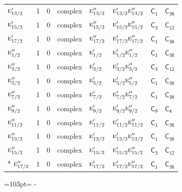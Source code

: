 \documentclass[10pt,a4paper]{article}
\newcommand{\needspace}[1]{\par\penalty-100\begingroup\dimen0=#1\relax\dimen2=\pagegoal
  \advance\dimen2-\pagetotal\ifdim\dimen0>\dimen2\relax\ifdim\dimen2>0pt\vfil\break\fi\fi
  \endgroup}
\numberwithin{equation}{section}
\newcommand{\grp}[1]{\mathsf{#1}}
\newcommand{\irr}[1]{\text{\normalfont\scshape #1}}
\begin{document}
{\begin{longtable}{@{}lrrlllll@{}}
$\irr{e}_{13/2}'$ & 1 & $0$ & complex & $\irr{e}_{13/2}''$ & $\irr{e}_{13/2}'\irr{e}_{13/2}''$ & \href{C1.pdf}{$\grp{C_{1}}$} & $\grp{C_{36}}$\\
$\irr{e}_{15/2}'$ & 1 & $0$ & complex & $\irr{e}_{15/2}''$ & $\irr{e}_{15/2}'\irr{e}_{15/2}''$ & \href{C3.pdf}{$\grp{C_{3}}$} & \href{../../../rotation/data/pdf/C12.pdf}{$\grp{C_{12}}$}\\
$\irr{e}_{17/2}'$ & 1 & $0$ & complex & $\irr{e}_{17/2}''$ & $\irr{e}_{17/2}'\irr{e}_{17/2}''$ & \href{C1.pdf}{$\grp{C_{1}}$} & $\grp{C_{36}}$\\
$\irr{e}_{1/2}''$ & 1 & $0$ & complex & $\irr{e}_{1/2}'$ & $\irr{e}_{1/2}'\irr{e}_{1/2}''$ & \href{C1.pdf}{$\grp{C_{1}}$} & $\grp{C_{36}}$\\
$\irr{e}_{3/2}''$ & 1 & $0$ & complex & $\irr{e}_{3/2}'$ & $\irr{e}_{3/2}'\irr{e}_{3/2}''$ & \href{C3.pdf}{$\grp{C_{3}}$} & \href{../../../rotation/data/pdf/C12.pdf}{$\grp{C_{12}}$}\\
$\irr{e}_{5/2}''$ & 1 & $0$ & complex & $\irr{e}_{5/2}'$ & $\irr{e}_{5/2}'\irr{e}_{5/2}''$ & \href{C1.pdf}{$\grp{C_{1}}$} & $\grp{C_{36}}$\\
$\irr{e}_{7/2}''$ & 1 & $0$ & complex & $\irr{e}_{7/2}'$ & $\irr{e}_{7/2}'\irr{e}_{7/2}''$ & \href{C1.pdf}{$\grp{C_{1}}$} & $\grp{C_{36}}$\\
$\irr{e}_{9/2}''$ & 1 & $0$ & complex & $\irr{e}_{9/2}'$ & $\irr{e}_{9/2}'\irr{e}_{9/2}''$ & \href{C9.pdf}{$\grp{C_{9}}$} & \href{../../../rotation/data/pdf/C4.pdf}{$\grp{C_{4}}$}\\
$\irr{e}_{11/2}''$ & 1 & $0$ & complex & $\irr{e}_{11/2}'$ & $\irr{e}_{11/2}'\irr{e}_{11/2}''$ & \href{C1.pdf}{$\grp{C_{1}}$} & $\grp{C_{36}}$\\
$\irr{e}_{13/2}''$ & 1 & $0$ & complex & $\irr{e}_{13/2}'$ & $\irr{e}_{13/2}'\irr{e}_{13/2}''$ & \href{C1.pdf}{$\grp{C_{1}}$} & $\grp{C_{36}}$\\
$\irr{e}_{15/2}''$ & 1 & $0$ & complex & $\irr{e}_{15/2}'$ & $\irr{e}_{15/2}'\irr{e}_{15/2}''$ & \href{C3.pdf}{$\grp{C_{3}}$} & \href{../../../rotation/data/pdf/C12.pdf}{$\grp{C_{12}}$}\\*
$\irr{e}_{17/2}''$ & 1 & $0$ & complex & $\irr{e}_{17/2}'$ & $\irr{e}_{17/2}'\irr{e}_{17/2}''$ & \href{C1.pdf}{$\grp{C_{1}}$} & $\grp{C_{36}}$\\
\bottomrule\end{longtable}}
\needspace{103pt}
\end{document}
